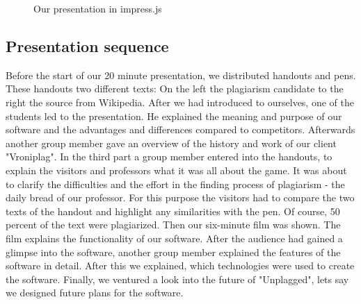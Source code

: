 \begin{figure}[!h]
  \centering
  \caption{Our presentation in impress.js}
  \label{fig:impress.js}
\end{figure}

\subsection{Presentation sequence}
Before the start of our 20 minute presentation, we distributed handouts and pens. These handouts two different texts: On the left the plagiarism candidate to the right the source from Wikipedia.
After we had introduced to ourselves, one of the students led to the presentation. He explained the meaning and purpose of our software and the advantages and differences compared to competitors. Afterwards another group member gave an overview of the history and work of our client "Vroniplag". 
In the third part a group member entered into the handouts, to explain the visitors and professors what it was all about the game. It was about to clarify the difficulties and the effort in the finding process of plagiarism - the daily bread of our professor. For this purpose the visitors had to compare the two texts of the handout and highlight any similarities with the pen. Of course, 50 percent of the text were plagiarized.
Then our six-minute film was shown. The film explains the functionality of our software. 
After the audience had gained a glimpse into the software, another group member explained the features of the software in detail. After this we explained, which technologies were used to create the software. Finally, we ventured a look into the future of "Unplagged", lets say we designed future plans for the software.


